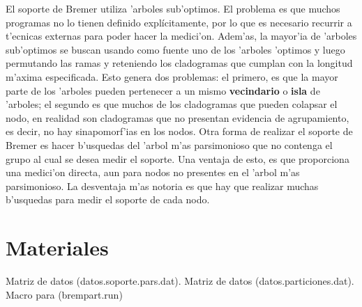 El soporte de Bremer utiliza 'arboles sub'optimos. El problema es que muchos programas no lo tienen definido expl\'icitamente, por lo que es necesario recurrir a t'ecnicas externas para poder hacer la medici'on. Adem'as, la mayor'ia de 'arboles sub'optimos se buscan usando como fuente uno de los 'arboles 'optimos y luego permutando las ramas y reteniendo los cladogramas que cumplan con la longitud m'axima especificada. Esto genera dos problemas: el primero, es que la mayor parte de los 'arboles pueden pertenecer a un mismo \textbf{vecindario} o \textbf{isla} de 'arboles; el segundo es que muchos de los cladogramas que pueden colapsar el nodo, en realidad son cladogramas que no presentan evidencia de agrupamiento, es decir, no hay sinapomorf'ias en los nodos. Otra forma de realizar el soporte de Bremer es hacer b'usquedas del 'arbol m'as parsimonioso que no contenga el grupo al cual se desea medir el soporte. Una ventaja de esto, es que proporciona una medici'on directa, aun para nodos no presentes en el 'arbol m'as parsimonioso. La desventaja m'as notoria es que hay que realizar muchas b'usquedas para medir el soporte de cada nodo.
\section{Materiales}
\noindent
Matriz de datos (datos.soporte.pars.dat).
Matriz de datos (datos.particiones.dat).
Macro para  (brempart.run)
